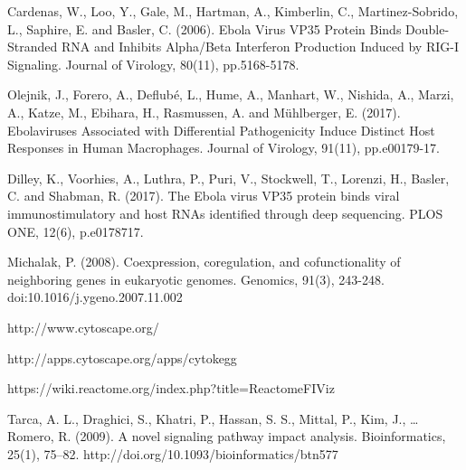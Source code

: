 \documentclass[twocolumn]{article}
\begin{document}
\begin{thebibliography}{9}
	Cardenas, W., Loo, Y., Gale, M., Hartman, A., Kimberlin, C., Martinez-Sobrido, L., Saphire, E. and Basler, C. (2006). Ebola Virus VP35 Protein Binds Double-Stranded RNA and Inhibits Alpha/Beta Interferon Production Induced by RIG-I Signaling. Journal of Virology, 80(11), pp.5168-5178.
	
	Olejnik, J., Forero, A., Deflubé, L., Hume, A., Manhart, W., Nishida, A., Marzi, A., Katze, M., Ebihara, H., Rasmussen, A. and Mühlberger, E. (2017). Ebolaviruses Associated with Differential Pathogenicity Induce Distinct Host Responses in Human Macrophages. Journal of Virology, 91(11), pp.e00179-17.
	
	Dilley, K., Voorhies, A., Luthra, P., Puri, V., Stockwell, T., Lorenzi, H., Basler, C. and Shabman, R. (2017). The Ebola virus VP35 protein binds viral immunostimulatory and host RNAs identified through deep sequencing. PLOS ONE, 12(6), p.e0178717.
	

	Michalak, P. (2008). Coexpression, coregulation, and cofunctionality of neighboring genes in eukaryotic genomes. Genomics, 91(3), 243-248. doi:10.1016/j.ygeno.2007.11.002 
	
	http://www.cytoscape.org/
	
	http://apps.cytoscape.org/apps/cytokegg
	
	https://wiki.reactome.org/index.php?title=ReactomeFIViz
	
	Tarca, A. L., Draghici, S., Khatri, P., Hassan, S. S., Mittal, P., Kim, J., … Romero, R. (2009). A novel signaling pathway impact analysis. Bioinformatics, 25(1), 75–82. http://doi.org/10.1093/bioinformatics/btn577
	
	
\end{thebibliography}
\end{document}
